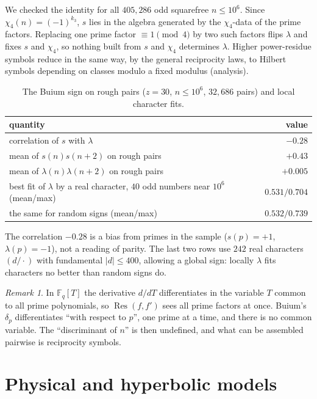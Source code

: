\documentclass[11pt]{amsart}
\theoremstyle{definition}
\theoremstyle{remark}
\newtheorem{remark}[theorem]{Remark}
\newcommand{\F}{\mathbb{F}}
\newcommand{\Res}{\operatorname{Res}}
\begin{document}
We checked the identity for all $405{,}286$ odd squarefree $n\le10^6$. Since $\chi_4(n)=(-1)^{k_3}$, $s$ lies in the algebra generated by the $\chi_4$-data of the prime factors. Replacing one prime factor $\equiv1\pmod4$ by two such factors flips $\lambda$ and fixes $s$ and $\chi_4$, so nothing built from $s$ and $\chi_4$ determines $\lambda$. Higher power-residue symbols reduce in the same way, by the general reciprocity laws, to Hilbert symbols depending on classes modulo a fixed modulus (analysis).

\begin{table}[h]
\centering\small
\caption{The Buium sign on rough pairs ($z=30$, $n\le10^6$, $32{,}686$ pairs) and local character fits.}\label{tab:buium}
\begin{tabular}{lr}
\toprule
quantity & value\\
\midrule
correlation of $s$ with $\lambda$ & $-0.28$\\
mean of $s(n)s(n+2)$ on rough pairs & $+0.43$\\
mean of $\lambda(n)\lambda(n+2)$ on rough pairs & $+0.005$\\
best fit of $\lambda$ by a real character, $40$ odd numbers near $10^6$ (mean/max) & $0.531/0.704$\\
the same for random signs (mean/max) & $0.532/0.739$\\
\bottomrule
\end{tabular}
\end{table}

The correlation $-0.28$ is a bias from primes in the sample ($s(p)=+1$, $\lambda(p)=-1$), not a reading of parity. The last two rows use $242$ real characters $(d/\cdot)$ with fundamental $|d|\le400$, allowing a global sign: locally $\lambda$ fits characters no better than random signs do.

\begin{remark}
In $\F_q[T]$ the derivative $d/dT$ differentiates in the variable $T$ common to all prime polynomials, so $\Res(f,f')$ sees all prime factors at once. Buium's $\delta_p$ differentiates ``with respect to $p$'', one prime at a time, and there is no common variable. The ``discriminant of $n$'' is then undefined, and what can be assembled pairwise is reciprocity symbols.
\end{remark}

\section{Physical and hyperbolic models}\label{sec:physics}
\end{document}
